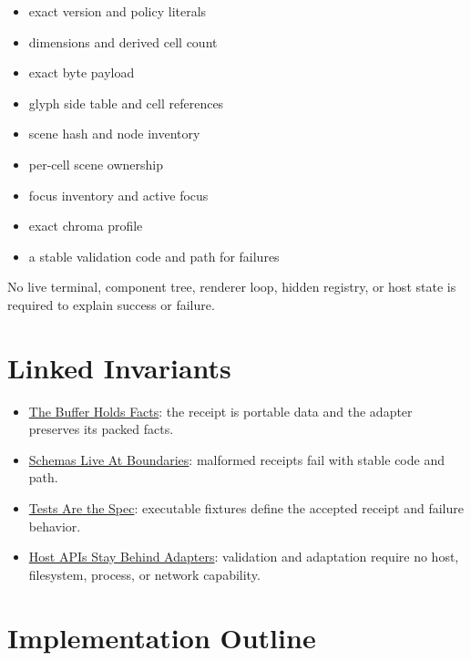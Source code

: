 \begin{itemize}
\tightlist
\item
  exact version and policy literals
\item
  dimensions and derived cell count
\item
  exact byte payload
\item
  glyph side table and cell references
\item
  scene hash and node inventory
\item
  per-cell scene ownership
\item
  focus inventory and active focus
\item
  exact chroma profile
\item
  a stable validation code and path for failures
\end{itemize}

No live terminal, component tree, renderer loop, hidden registry, or host state is required to explain success or failure.

\section{Linked Invariants}\label{record-164-linked-invariants}

\begin{itemize}
\tightlist
\item
  \href{https://github.com/flyingrobots/bijou/blob/cbd70612140e7a450d764b3c7be1c6af878b99bc/docs/invariants/buffer-holds-facts.md}{The Buffer Holds Facts}: the receipt is portable data and the adapter preserves its packed facts.
\item
  \href{https://github.com/flyingrobots/bijou/blob/cbd70612140e7a450d764b3c7be1c6af878b99bc/docs/invariants/schemas-live-at-boundaries.md}{Schemas Live At Boundaries}: malformed receipts fail with stable code and path.
\item
  \href{https://github.com/flyingrobots/bijou/blob/cbd70612140e7a450d764b3c7be1c6af878b99bc/docs/invariants/tests-are-the-spec.md}{Tests Are the Spec}: executable fixtures define the accepted receipt and failure behavior.
\item
  \href{https://github.com/flyingrobots/bijou/blob/cbd70612140e7a450d764b3c7be1c6af878b99bc/docs/invariants/host-apis-stay-behind-adapters.md}{Host APIs Stay Behind Adapters}: validation and adaptation require no host, filesystem, process, or network capability.
\end{itemize}

\section{Implementation Outline}\label{record-164-implementation-outline}

